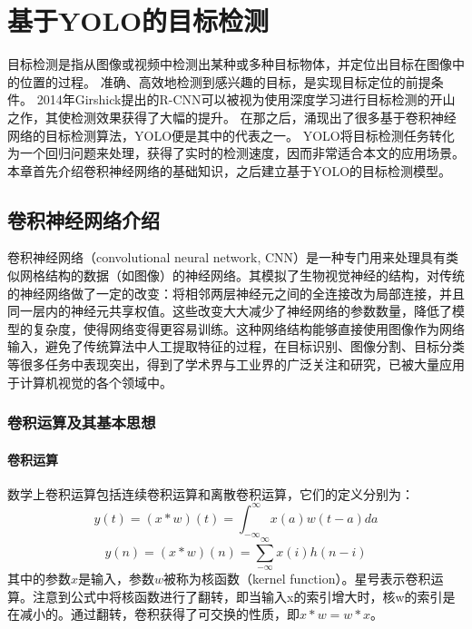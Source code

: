 
\chapter{基于YOLO的目标检测}
目标检测是指从图像或视频中检测出某种或多种目标物体，并定位出目标在图像中的位置的过程。
准确、高效地检测到感兴趣的目标，是实现目标定位的前提条件。
2014年Girshick提出的R-CNN可以被视为使用深度学习进行目标检测的开山之作，其使检测效果获得了大幅的提升。
在那之后，涌现出了很多基于卷积神经网络的目标检测算法，YOLO便是其中的代表之一。
YOLO将目标检测任务转化为一个回归问题来处理，获得了实时的检测速度，因而非常适合本文的应用场景。
本章首先介绍卷积神经网络的基础知识，之后建立基于YOLO的目标检测模型。

\section{卷积神经网络介绍}
卷积神经网络（convolutional neural network, CNN）\cite{lecun1989}是一种专门用来处理具有类似网格结构的数据（如图像）的神经网络\cite{Goodfellow-et-al-2016}。其模拟了生物视觉神经的结构，对传统的神经网络做了一定的改变：将相邻两层神经元之间的全连接改为局部连接，并且同一层内的神经元共享权值。这些改变大大减少了神经网络的参数数量，降低了模型的复杂度，使得网络变得更容易训练。这种网络结构能够直接使用图像作为网络输入，避免了传统算法中人工提取特征的过程，在目标识别、图像分割、目标分类等很多任务中表现突出，得到了学术界与工业界的广泛关注和研究，已被大量应用于计算机视觉的各个领域中。



\subsection{卷积运算及其基本思想}
\subsubsection{卷积运算}
数学上卷积运算包括连续卷积运算和离散卷积运算，它们的定义分别为：
%
\begin{equation}\label{eq:3_1_0}
y(t) = (x*w)(t) = \int_{-\infty}^{\infty}x(a)w(t-a)da
\end{equation}
\begin{equation}
y(n) = (x*w)(n) = \sum_{-\infty}^{\infty}x(i)h(n-i)
\end{equation}
其中的参数$x$是输入，参数$w$被称为核函数（kernel function）。星号表示卷积运算。注意到公式中将核函数进行了翻转，即当输入x的索引增大时，核w的索引是在减小的。通过翻转，卷积获得了可交换的性质，即$x*w=w*x$。

